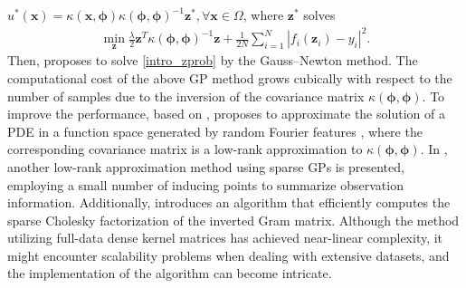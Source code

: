 \documentclass[10pt,reqno]{amsart}
\newcommand{\1}{{\chi}}
\numberwithin{equation}{section}
\theoremstyle{thmlemcorr}
\numberwithin{theorem}{section}
\theoremstyle{thmlemcorr*}
\theoremstyle{defi}
\theoremstyle{remexample}
\theoremstyle{ass}
\begin{document}
	$u^*(\boldsymbol{x}) = \kappa(\boldsymbol{x}, \boldsymbol{\phi})\kappa(\boldsymbol{\phi, \boldsymbol{\phi}})^{-1}\boldsymbol{z}^*, \forall \boldsymbol{x}\in \Omega$, 
where $\boldsymbol{z}^*$ solves
\begin{align}
	\label{intro_zprob}
	\min_{\boldsymbol{z}} \frac{\lambda}{2}\boldsymbol{z}^T\kappa(\boldsymbol{\phi}, \boldsymbol{\phi})^{-1}\boldsymbol{z} + \frac{1}{2N}\sum_{i=1}^N|f_i(\boldsymbol{z}_i)-y_i|^2. 
\end{align}
Then, \cite{chen2021solving} proposes to solve \eqref{intro_zprob} by the Gauss--Newton method.
The computational cost of the above GP method grows cubically with respect to the number of samples due to the inversion of the covariance matrix $\kappa(\boldsymbol{\phi}, \boldsymbol{\phi})$. To improve the performance, based on \cite{chen2021solving}, \cite{mou2022numerical} proposes to approximate the solution of a PDE in a function space generated by random Fourier features \cite{rahimi2007random, yu2016orthogonal}, where the corresponding covariance matrix is a low-rank approximation to $\kappa(\boldsymbol{\phi}, \boldsymbol{\phi})$. In \cite{meng2022sparse}, another low-rank approximation method using sparse GPs is presented, employing a small number of inducing points to summarize observation information. Additionally, \cite{chen2023sparse} introduces an algorithm that efficiently computes the sparse Cholesky factorization of the inverted Gram matrix. Although the method utilizing full-data dense kernel matrices has achieved near-linear complexity, it might encounter scalability problems when dealing with extensive datasets, and the implementation of the algorithm can become intricate.
\end{document}
